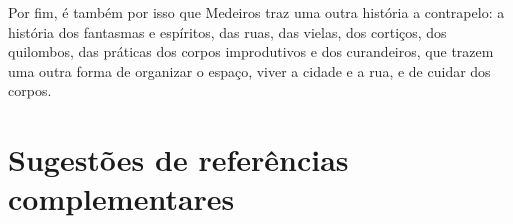 \documentclass[12pt]{extarticle}
\begin{document}
Por fim, é também por isso que Medeiros traz uma outra história a
contrapelo: a história dos fantasmas e espíritos, das ruas, das vielas,
dos cortiços, dos quilombos, das práticas dos corpos improdutivos e dos
curandeiros, que trazem uma outra forma de organizar o espaço, viver a
cidade e a rua, e de cuidar dos corpos.

\section{Sugestões de referências complementares}


\end{document}
